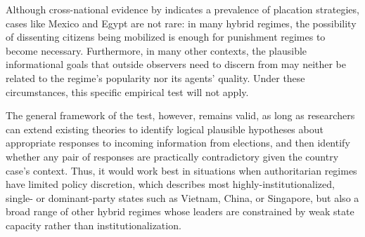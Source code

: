 \documentclass[12pt]{article}
\newcommand{\1}{\mathbbm{1}}
\begin{document}
Although cross-national evidence by \citet{Miller2015} indicates a prevalence of placation strategies, cases like Mexico and Egypt are not rare: in many hybrid regimes, the possibility of dissenting citizens being mobilized is enough for punishment regimes to become necessary. Furthermore, in many other contexts, the plausible informational goals that outside observers need to discern from may neither be related to the regime's popularity nor its agents' quality. Under these circumstances, this specific empirical test will not apply. 

The general framework of the test, however, remains valid, as long as researchers can extend existing theories to identify logical plausible hypotheses about appropriate responses to incoming information from elections, and then identify whether any pair of responses are practically contradictory given the country case's context. Thus, it would work best in situations when authoritarian regimes have limited policy discretion, which describes most highly-institutionalized, single- or dominant-party states such as Vietnam, China, or Singapore, but also a broad range of other hybrid regimes whose leaders are constrained by weak state capacity rather than institutionalization.

\clearpage
{}
\printbibliography[heading=bibintoc]
\end{document}
